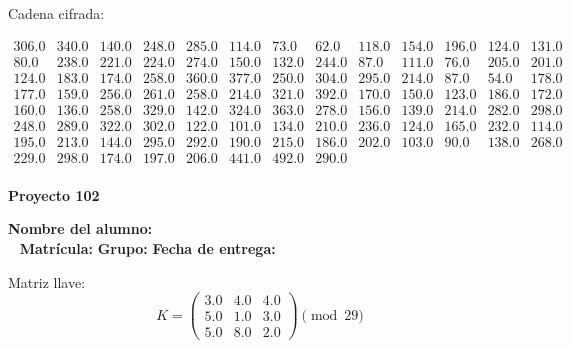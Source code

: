 \documentclass[12pt]{article}
\begin{document}
Cadena cifrada:
\begin{center}
$\begin{array}{lllllllllllll}
306.0 & 340.0 & 140.0 & 248.0 & 285.0 & 114.0 & 73.0 & 62.0 & 118.0 & 154.0 & 196.0 & 124.0 & 131.0\\
80.0 & 238.0 & 221.0 & 224.0 & 274.0 & 150.0 & 132.0 & 244.0 & 87.0 & 111.0 & 76.0 & 205.0 & 201.0\\
124.0 & 183.0 & 174.0 & 258.0 & 360.0 & 377.0 & 250.0 & 304.0 & 295.0 & 214.0 & 87.0 & 54.0 & 178.0\\
177.0 & 159.0 & 256.0 & 261.0 & 258.0 & 214.0 & 321.0 & 392.0 & 170.0 & 150.0 & 123.0 & 186.0 & 172.0\\
160.0 & 136.0 & 258.0 & 329.0 & 142.0 & 324.0 & 363.0 & 278.0 & 156.0 & 139.0 & 214.0 & 282.0 & 298.0\\
248.0 & 289.0 & 322.0 & 302.0 & 122.0 & 101.0 & 134.0 & 210.0 & 236.0 & 124.0 & 165.0 & 232.0 & 114.0\\
195.0 & 213.0 & 144.0 & 295.0 & 292.0 & 190.0 & 215.0 & 186.0 & 202.0 & 103.0 & 90.0 & 138.0 & 268.0\\
229.0 & 298.0 & 174.0 & 197.0 & 206.0 & 441.0 & 492.0 & 290.0\\
\end{array}$
\end{center}

\newpage


\textbf{Proyecto 102}

\textbf{Nombre del alumno:} \underline{\hspace{13cm}}\\\
\vspace{1cm}
\textbf{Matrícula:} \underline{\hspace{4cm}} \hspace{1cm}
\textbf{Grupo:} \underline{\hspace{2cm}}
\textbf{Fecha de entrega:} \underline{\hspace{2cm}}

\medskip

Matriz llave:
\[
K = \begin{pmatrix}
3.0 & 4.0 & 4.0\\
5.0 & 1.0 & 3.0\\
5.0 & 8.0 & 2.0
\end{pmatrix} \pmod{29}
\]
\end{document}
